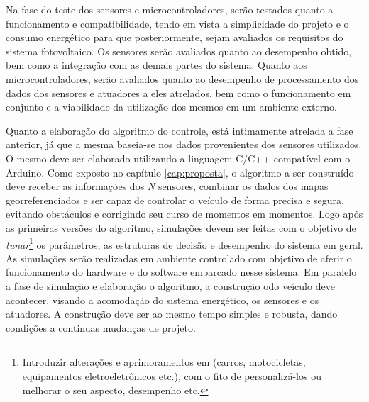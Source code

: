 Na fase do teste dos sensores e microcontroladores, serão testados quanto a funcionamento e compatibilidade, tendo em vista a simplicidade do projeto e o consumo energético para que posteriormente, sejam avaliados os requisitos do sistema fotovoltaico. Os  sensores serão avaliados quanto ao desempenho obtido, bem como a integração com as demais partes do sistema. Quanto aos microcontroladores, serão avaliados quanto ao desempenho de processamento dos dados dos sensores e atuadores a eles atrelados, bem como o funcionamento em conjunto e a viabilidade da utilização dos mesmos em um ambiente externo.

Quanto a elaboração do algoritmo do controle, está intimamente atrelada a fase anterior, já que a mesma baseia-se nos dados provenientes dos sensores utilizados. O mesmo deve ser elaborado utilizando a linguagem C/C++ compatível com o Arduino. Como exposto no capítulo \ref{cap:proposta}, o algoritmo a ser construído deve receber as informações dos \textit{N} sensores, combinar os dados dos mapas georreferenciados e ser capaz de controlar o veículo de forma precisa e segura, evitando obstáculos e corrigindo seu curso de momentos em momentos. Logo após as primeiras versões do algoritmo, simulações devem ser feitas com o objetivo de \textit{tunar}\footnote{Introduzir alterações e aprimoramentos em (carros, motocicletas, equipamentos eletroeletrônicos etc.), com o fito de personalizá-los ou melhorar o seu aspecto, desempenho etc.} os parâmetros, as estruturas de decisão e desempenho do sistema em geral. As simulações serão realizadas em ambiente controlado com objetivo de aferir o funcionamento do hardware e do software embarcado nesse sistema. Em paralelo a fase de simulação e elaboração o algoritmo, a construção odo veículo deve acontecer, visando a acomodação do sistema energético, os sensores e os atuadores. A construção deve ser ao mesmo tempo simples e robusta, dando condições a continuas mudanças de projeto.

